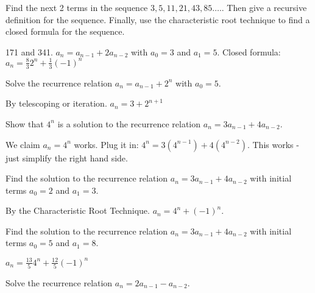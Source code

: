 \begin{questions}

\question Find the next 2 terms in the sequence $3, 5, 11, 21, 43, 85\ldots.$.  Then give a recursive definition for the sequence.  Finally, use the characteristic root technique to find a closed formula for the sequence.

	\begin{answer}
		171 and 341.  $a_n = a_{n-1} + 2a_{n-2}$ with $a_0 = 3$ and $a_1 = 5$.  Closed formula: $a_n = \frac{8}{3}2^n + \frac{1}{3}(-1)^n$
	\end{answer}
	
	
	


\question Solve the recurrence relation $a_n = a_{n-1} + 2^n$ with $a_0 = 5$.

	\begin{answer}
		By telescoping or iteration.  $a_n = 3 + 2^{n+1}$
	\end{answer}
	
	
	


\question Show that $4^n$ is a solution to the recurrence relation $a_n = 3a_{n-1} + 4a_{n-2}$.

	\begin{answer}
		We claim $a_n = 4^n$ works.  Plug it in: $4^n = 3(4^{n-1}) + 4(4^{n-2})$.  This works - just simplify the right hand side.
	\end{answer}
	
	
	


\question Find the solution to the recurrence relation $a_n = 3a_{n-1} + 4a_{n-2}$ with initial terms $a_0 = 2$ and $a_1 = 3$.

	\begin{answer}
		By the Characteristic Root Technique.  $a_n = 4^n + (-1)^n$.
	\end{answer}
	
	
	


\question Find the solution to the recurrence relation $a_n = 3a_{n-1} + 4a_{n-2}$ with initial terms $a_0 = 5$ and $a_1 = 8$.

	\begin{answer}
		$a_n = \frac{13}{5} 4^n + \frac{12}{5} (-1)^n$
	\end{answer}
	
	
	


\question Solve the recurrence relation $a_n = 2a_{n-1} - a_{n-2}$.
\begin{parts}

\end{parts}
\end{questions}
